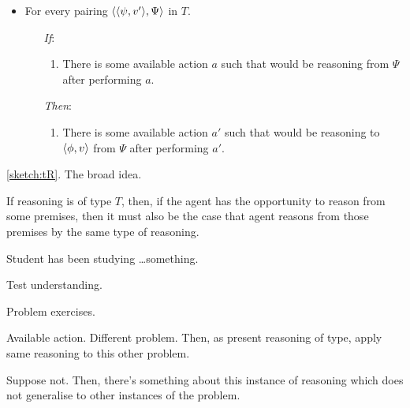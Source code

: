 \begin{note}
\begin{sketch}[\tR{2}]
    \begin{itemize}[noitemsep]
      \item
        For every pairing \(\langle \langle \psi, v' \rangle, \Psi \rangle\) in \(T\).
        \begin{itemize}[noitemsep]
        \item[\emph{If}:]
          \begin{enumerate}[label=\alph*., ref=(\alph*), series=tRSketch]
          \item
            There is some available action \(a\) such that \vAgent{} would be reasoning from \(\Psi\) after performing \(a\).
          \end{enumerate}
        \item[\emph{Then}:]
          \begin{enumerate}[label=\alph*., ref=(\alph*), resume*=tRSketch]
          \item
            There is some available action \(a'\) such that \vAgent{} would be reasoning to \(\langle \phi, v \rangle\) from \(\Psi\) after performing \(a'\).
          \end{enumerate}
        \end{itemize}
      \end{itemize}
    \vspace{-\baselineskip}
  \end{sketch}

  \autoref{sketch:tR}.
  The broad idea.

  If reasoning is of type \(T\), then, if the agent has the opportunity to reason from some premises, then it must also be the case that agent reasons from those premises by the same type of reasoning.
\end{note}

\begin{note}
  \begin{illustration}[Textbook]
    Student has been studying \dots something.

    Test understanding.

    Problem exercises.
  \end{illustration}

  Available action.
  Different problem.
  Then, as present reasoning of type, apply same reasoning to this other problem.

  Suppose not.
  Then, there's something about this instance of reasoning which does not generalise to other instances of the problem.
\end{note}

